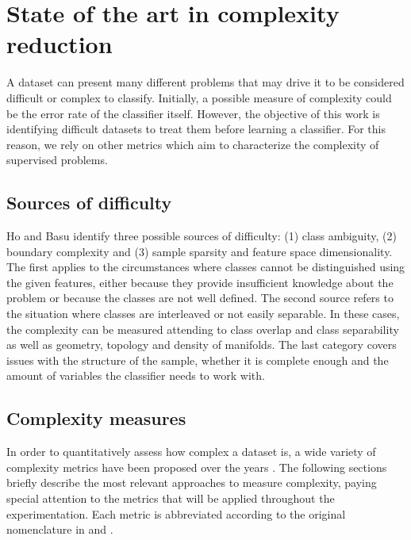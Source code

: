 \documentclass[
	fontsize=11pt, %
	twoside=false, %
	open=any, %
	secnumdepth=1, %
]{kaobook}
\newcommand{\rechange}[1]{{\color{blue}#1}}
\renewcommand{\rechange}[1]{#1}
\begin{document}
\section{State of the art in complexity reduction}\label{sec.sota}

A dataset can present many different problems that may drive it to be considered difficult or complex to classify. Initially, a possible measure of complexity could be the error rate of the classifier itself. However, the objective of this work is identifying difficult datasets to treat them before learning a classifier. For this reason, we rely on other metrics which aim to characterize the complexity of supervised problems.

\subsection{Sources of difficulty}

Ho and Basu \cite{basubook} identify three possible sources of difficulty: (1) class ambiguity, (2) boundary complexity and (3) sample sparsity and feature space dimensionality. The first applies to the circumstances where classes cannot be distinguished using the given features, either because they provide insufficient knowledge about the problem or because the classes are not well defined. The second source refers to the situation where classes are interleaved or not easily separable. In these cases, the complexity can be measured attending to class overlap and class separability as well as geometry, topology and density of manifolds. The last category covers issues with the structure of the sample, whether it is complete enough and the amount of variables the classifier needs to work with.


\subsection{Complexity measures}\label{sec.compmeas}

In order to quantitatively assess how complex a dataset is, a wide variety of complexity metrics have been proposed over the years \cite{ho2000measuring,lorena2019complex}. The following sections briefly describe the most relevant approaches to measure complexity, paying special attention to the metrics that will be \rechange{applied} throughout the experimentation. Each metric is abbreviated according to the original nomenclature in \cite{ho2000measuring} and \cite{lorena2019complex}.
\end{document}
